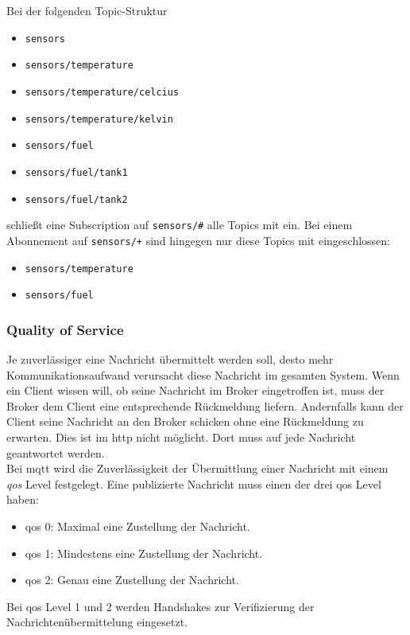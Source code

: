 Bei der folgenden Topic-Struktur
\begin{itemize}
    \item \verb|sensors|
    \item \verb|sensors/temperature|
    \item \verb|sensors/temperature/celcius|
    \item \verb|sensors/temperature/kelvin|
    \item \verb|sensors/fuel|
    \item \verb|sensors/fuel/tank1|
    \item \verb|sensors/fuel/tank2|
\end{itemize}
schlie{\ss}t eine Subscription auf \verb|sensors/#| alle Topics mit ein. Bei einem Abonnement auf \verb|sensors/+| sind hingegen nur diese Topics mit eingeschlossen:
\begin{itemize}
    \item \verb|sensors/temperature|
    \item \verb|sensors/fuel|
\end{itemize}

\subsubsection{Quality of Service} \label{s:qos}
Je zuverlässiger eine Nachricht übermittelt werden soll, desto mehr Kommunikationsaufwand verursacht diese Nachricht im gesamten System.
Wenn ein Client wissen will, ob seine Nachricht im Broker eingetroffen ist, muss der Broker dem Client eine entsprechende Rückmeldung liefern. Andernfalls kann der Client seine Nachricht an den Broker schicken ohne eine Rückmeldung zu erwarten. Dies ist im \ac{http} nicht möglicht. Dort muss auf jede Nachricht geantwortet werden.\\
Bei \ac{mqtt} wird die Zuverlässigkeit der Übermittlung einer Nachricht mit einem \textit{\acf{qos}} Level festgelegt. Eine publizierte Nachricht muss einen der drei \ac{qos} Level haben:
\begin{itemize}
    \item \ac{qos} 0: Maximal eine Zustellung der Nachricht.
    \item \ac{qos} 1: Mindestens eine Zustellung der Nachricht.
    \item \ac{qos} 2: Genau eine Zustellung der Nachricht.
\end{itemize}
Bei \ac{qos} Level 1 und 2 werden Handshakes zur Verifizierung der Nachrichtenübermittelung eingesetzt.\cite{mqtt5Specification}

